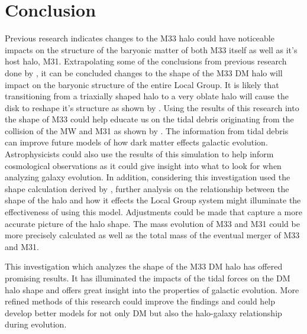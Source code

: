 \documentclass[usenatbib]{mnras}
\begin{document}
\section{Conclusion}
Previous research indicates changes to the M33 halo could have noticeable impacts on the structure of the baryonic matter of both M33 itself as well as it's host halo, M31. Extrapolating some of the conclusions from previous research done by \cite{Law10, Debattista_2013, Garavito-Camargo_2021}, it can be concluded changes to the shape of the M33 DM halo will impact on the baryonic structure of the entire Local Group. It is likely that transitioning from a triaxially shaped halo to a very oblate halo will cause the disk to reshape it's structure as shown by \cite{Debattista_2013}. Using the results of this research into the shape of M33 could help educate us on the tidal debris originating from the collision of the MW and M31 as shown by \cite{Law10}. The information from tidal debris can improve future models of how dark matter effects galactic evolution. Astrophysicists could also use the results of this simulation to help inform cosmological observations as it could give insight into what to look for when analyzing galaxy evolution. In addition, considering this investigation used the shape calculation derived by \cite{Garavito-Camargo_2021}, further analysis on the relationship between the shape of the halo and how it effects the Local Group system might illuminate the effectiveness of using this model. Adjustments could be made that capture a more accurate picture of the halo shape. The mass evolution of M33 and M31 could be more precisely calculated as well as the total mass of the eventual merger of M33 and M31. 

This investigation which analyzes the shape of the M33 DM halo has offered promising results. It has illuminated the impacts of the tidal forces on the DM halo shape and offers great insight into the properties of galactic evolution. More refined methods of this research could improve the findings and could help develop better models for not only DM but also the halo-galaxy relationship during evolution.  
\end{document}
